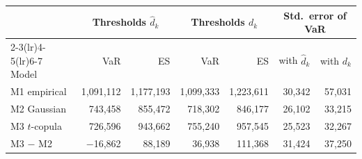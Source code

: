 \begin{tabular}{lrrrrrr}
\toprule
 & \multicolumn{2}{c}{Thresholds $\hat d_k$} & \multicolumn{2}{c}{Thresholds $d_k$} & \multicolumn{2}{c}{Std.\ error of VaR} \\
\cmidrule(lr){2-3}\cmidrule(lr){4-5}\cmidrule(lr){6-7}
Model & VaR & ES & VaR & ES & with $\hat d_k$ & with $d_k$ \\
\midrule
M1 empirical & 1,091,112 & 1,177,193 & 1,099,333 & 1,223,611 & 30,342 & 57,031 \\
M2 Gaussian & 743,458 & 855,472 & 718,302 & 846,177 & 26,102 & 33,215 \\
M3 $t$-copula & 726,596 & 943,662 & 755,240 & 957,545 & 25,523 & 32,267 \\
\midrule
M3 $-$ M2 & $-$16,862 & 88,189 & 36,938 & 111,368 & 31,424 & 37,250 \\
\bottomrule
\end{tabular}
